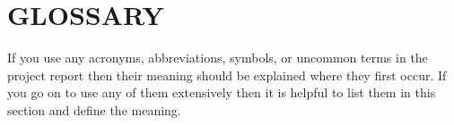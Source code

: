 
\chapter{GLOSSARY} %

\label{GLOSSARY} %


If you use any acronyms, abbreviations, symbols, or uncommon terms in the project report then their meaning should be explained where they first occur. If you go on to use any of them extensively then it is helpful to list them in this section and define the meaning.